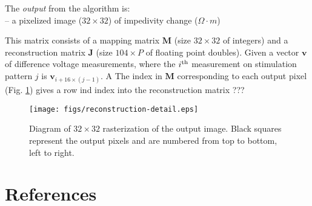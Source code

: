 \documentclass[letterpaper,twocolumn,11pt]{article}
\newcommand{\vB}{\mbox{$\mathbf{v}$}}
\newcommand{\RB}{\mbox{$\mathbf{J}$}}
\newcommand{\MB}{\mbox{$\mathbf{M}$}}
\begin{document}
The {\em output} from the algorithm is:
\\
   -- a pixelized image ($32\times 32$) of 
      impedivity change ($\Omega \cdot m$)


      This matrix consists of a mapping matrix $\MB$ (size $32\times 32$ of
      integers) and a reconstruction matrix $\RB$ (size $104\times P$ of
      floating point doubles).
      Given a vector $\vB$ of difference voltage measurements, where
      the $i^{\rm th}$ measurement on stimulation pattern $j$ is
      $\vB_{i+16\times(j-1)}$. A 
      The index in $\MB$ corresponding to each output pixel
      (Fig. \ref{fig:reconst_detail}) gives a row ind index into the
      reconstruction matrix 
???

\begin{figure}[bhtp]
\begin{center}
  \texttt{[image: figs/reconstruction-detail.eps]}

\caption{ \label{fig:reconst_detail}
Diagram of $32\times 32$ rasterization of the output image. Black
squares represent the output pixels and are numbered from top
to bottom, left to right.
}
\end{center}
\end{figure}



\section*{References}
\end{document}
